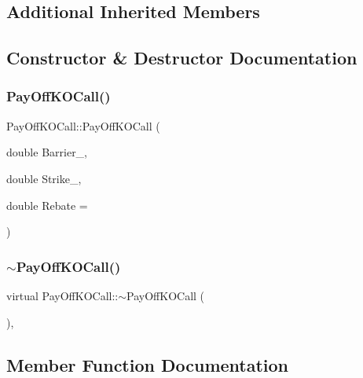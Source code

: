 \subsection*{Additional Inherited Members}


\subsection{Constructor \& Destructor Documentation}
\hypertarget{classPayOffKOCall_a403c74f7aa9a08b9dfcd63abc04d0d69}{}\label{classPayOffKOCall_a403c74f7aa9a08b9dfcd63abc04d0d69} 
\subsubsection{\texorpdfstring{Pay\+Off\+K\+O\+Call()}{PayOffKOCall()}}
{\footnotesize\ttfamily Pay\+Off\+K\+O\+Call\+::\+Pay\+Off\+K\+O\+Call (\begin{DoxyParamCaption}\item[{double}]{Barrier\+\_\+,  }\item[{double}]{Strike\+\_\+,  }\item[{double}]{Rebate = {} }\end{DoxyParamCaption})}

\hypertarget{classPayOffKOCall_a5493ec945a712131e2067914e0401abc}{}\label{classPayOffKOCall_a5493ec945a712131e2067914e0401abc} 
\subsubsection{\texorpdfstring{$\sim$\+Pay\+Off\+K\+O\+Call()}{~PayOffKOCall()}}
{\footnotesize\ttfamily virtual Pay\+Off\+K\+O\+Call\+::$\sim$\+Pay\+Off\+K\+O\+Call (\begin{DoxyParamCaption}{ }\end{DoxyParamCaption})\hspace{0.3cm}{\ttfamily [inline]}, {\ttfamily [virtual]}}



\subsection{Member Function Documentation}
\hypertarget{classPayOffKOCall_ae54e9d15a598a2ec7ef2b68712a70009}{}\label{classPayOffKOCall_ae54e9d15a598a2ec7ef2b68712a70009} 
